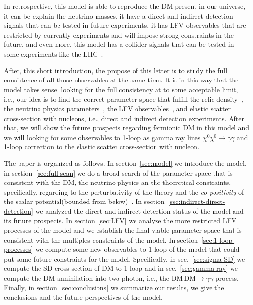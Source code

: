 \documentclass[12pt,letterpaper]{article}
\begin{document}
%
In retrospective, this model is able to reproduce the DM present in our universe, it can be explain the neutrino masses, it have a direct and indirect detection signals that can be tested in future experiments, it has LFV observables that are restricted by currently experiments and will impose strong constraints in the future, and even more, this model has a collider signals that can be tested in some experiments like the LHC~\cite{Choubey:2017yyn}. 

After, this short introduction, the propose of this letter is to study the full consistence of all those observables at the same time. It is in this way that the model takes sense, looking for the full consistency at to some acceptable limit, i.e., 
our idea is to find the correct parameter space that fulfill the relic density~\cite{Aghanim:2018eyx}, the neutrino physics parameters~\cite{Forero:2014bxa, deSalas:2017kay}, the LFV observables~\cite{Rocha-Moran:2016enp}, and elastic scatter cross-section with nucleons, i.e., direct and indirect detection experiments. 
After that, we will show the future prospects regarding fermionic DM in this model and we will looking for some observables to 1-loop as gamma ray lines $\chi^0\chi^0\to\gamma\gamma$ and 1-loop correction to the elastic scatter cross-section with nucleon.

The paper is organized as follows. In section~\ref{sec:model} we introduce the model, in section~\ref{sec:full-scan} we do a broad search of the parameter space that is consistent with the DM, the neutrino physics an the theoretical constraints, specifically, regarding to the perturbativity of the theory and the \textit{co-positivity} of the scalar potential(bounded from below)~\cite{Merle:2016scw}. 
In section~\ref{sec:indirect-direct-detection} we analyzed the direct and indirect detection status of the model and its future prospects. 
In section~\ref{sec:LFV} we analyze the more restricted LFV processes of the model and we establish the final viable parameter space that is consistent with the multiples constraints of the model.
In section~\ref{sec:1-loop-processes} we compute some new observables to 1-loop of the model that could put some future constraints for the model.
%
Specifically, in sec.~\ref{sec:sigma-SD} we compute the SD cross-section of DM to 1-loop and in sec.~\ref{sec:gamma-ray} we compute the DM annihilation into two photon, i.e., the $\text{DM}\,\text{DM} \to \gamma\gamma$ process.
Finally, in section~\ref{sec:conclusions} we summarize our results, we give the conclusions and the future perspectives of the model.
\end{document}
